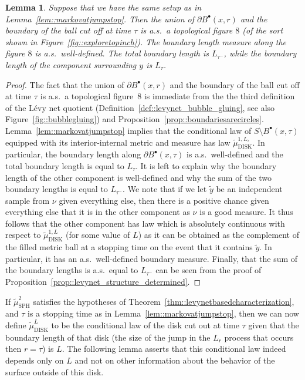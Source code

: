 \documentclass[10pt]{amsart}
\newcommand{\sbullet}{{\scriptscriptstyle\bullet}}
\theoremstyle{plain}
\numberwithin{theorem}{section}
\newtheorem{lemma}[theorem]{Lemma}
\theoremstyle{definition}
\newcommand{\tmustwo}{\wt{\mu}_{\mathrm{SPH}}^2}
\newcommand{\tmudonel}{\wt{\mu}_{ \mathrm{DISK}}^{1, L}}
\newcommand{\tmudl}{\wt{\mu}_{\mathrm{DISK}}^L}
\def\tmudonelset#1{\wt{\mu}_{ \mathrm{DISK}}^{1, #1}}
\let\wt\widetilde
\newcommand{\fb}[2]{B^\sbullet(#1,#2)}
\begin{document}
\begin{lemma}
\label{lem::figureeightlaws}
Suppose that we have the same setup as in Lemma~\ref{lem::markovatjumpstop}. Then the union of $\partial\fb{x}{r}$ and the boundary of the ball cut off at time $\tau$ is a.s.\ a topological figure $8$ (of the sort shown in Figure~\ref{fig::exploretopinch}). The boundary length measure along the figure $8$ is a.s.\ well-defined. The total boundary length is $L_{\tau^-}$, while the boundary length of the component surrounding $y$ is $L_\tau$.
\end{lemma}
\begin{proof}
The fact that the union of $\partial\fb{x}{r}$ and the boundary of the ball cut off at time $\tau$ is a.s.\ a topological figure~$8$ is immediate from the the third definition of the Lévy net quotient (Definition~\ref{def::levynet_bubble_gluing}, see also Figure~\ref{fig::bubblegluing}) and Proposition~\ref{prop::boundariesarecircles}. Lemma~\ref{lem::markovatjumpstop} implies that the conditional law of $S \setminus \fb{x}{\tau}$ equipped with its interior-internal metric and measure has law $\tmudonelset{L_\tau}$. In particular, the boundary length along $\partial \fb{x}{\tau}$ is a.s.\ well-defined and the total boundary length is equal to $L_\tau$. It is left to explain why the boundary length of the other component is well-defined and why the sum of the two boundary lengths is equal to $L_{\tau^-}$. We note that if we let $\wt{y}$ be an independent sample from $\nu$ given everything else, then there is a positive chance given everything else that it is in the other component as $\nu$ is a good measure. It thus follows that the other component has law which is absolutely continuous with respect to $\tmudonel$ (for some value of $L$) as it can be obtained as the complement of the filled metric ball at a stopping time on the event that it contains $\wt{y}$. In particular, it has an a.s.\ well-defined boundary measure. Finally, that the sum of the boundary lengths is a.s.\ equal to $L_{\tau^-}$ can be seen from the proof of Proposition~\ref{prop::levynet_structure_determined}.
\end{proof}

If $\tmustwo$ satisfies the hypotheses of Theorem~\ref{thm::levynetbasedcharacterization}, and $\tau$ is a stopping time as in Lemma~\ref{lem::markovatjumpstop}, then we can now define $\tmudl$ to be the conditional law of the disk cut out at time $\tau$ given that the boundary length of that disk (\ie the size of the jump in the $L_r$ process that occurs then $r = \tau$) is $L$. The following lemma asserts that this conditional law indeed depends only on $L$ and not on other information about the behavior of the surface outside of this disk.
\end{document}
